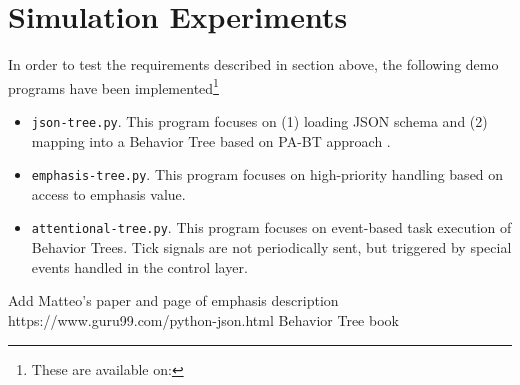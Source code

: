 \documentclass[10pt,a4paper]{article}
\begin{document}
\section*{Simulation Experiments}
In order to test the requirements described in section above, the following demo programs have been implemented\footnote{These are available on:}
\begin{itemize}
\item \verb|json-tree.py|. This program focuses on (1) loading JSON schema and (2) mapping into a Behavior Tree based on PA-BT approach \cite{b3}.
\item \verb|emphasis-tree.py|. This program focuses on high-priority handling based on access to emphasis value\cite{b1}.
\item \verb|attentional-tree.py|. This program focuses on event-based task execution of Behavior Trees. Tick signals are not periodically sent, but triggered by special events handled in the control layer.
\end{itemize}
\begin{thebibliography}{00}
 Add Matteo's paper and page of emphasis description
https://www.guru99.com/python-json.html
 Behavior Tree book
\end{thebibliography}
\end{document}
